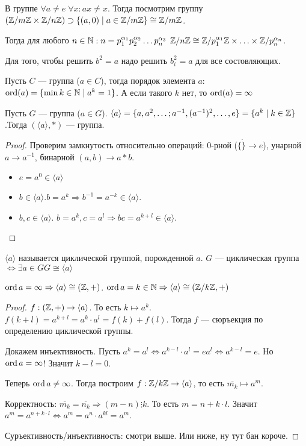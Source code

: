 В группе $\forall a \neq e\; \forall x: ax \neq x$. Тогда посмотрим группу  $(\mathbb{Z} / m\mathbb{Z} \times \mathbb{Z} / n\mathbb{Z}) \supset \{(a, 0) \mid a \in \mathbb{Z} / m\mathbb{Z}\} \cong \mathbb{Z} / m\mathbb{Z}$.
 
Тогда для любого $n \in \mathbb{N}: n = p_1^{\alpha_1} p_2^{\alpha_2}\ldots p_n^{\alpha_3}$  $\mathbb{Z} / n\mathbb{Z} \cong \mathbb{Z} / p_1^{\alpha_1}\mathbb{Z} \times \ldots \times \mathbb{Z} / p_n^{\alpha_n}$.
\begin{example}
    Для того, чтобы решить $b^2 = a$ надо решить  $b_i^2 = a$ для все состовляющих.
\end{example}
\begin{definition}
    Пусть $C$ --- группа ($a \in C$), тогда порядок элемента $a$:  $\operatorname{ord}(a) = \{\min k \in \mathbb{N} \mid a^k = 1\}$. А если такого  $k$ нет, то  $\operatorname{ord}(a) = \infty$
\end{definition}
\begin{lemma}
    Пусть $G$ --- группа ($a \in G$). $\langle a \rangle = \{a, a^2,\ldots; a^{-1}, (a^{-1})^2, \ldots, e\} = \{a^k \mid k \in \mathbb{Z}\}$.Тогда $(\langle a \rangle, *)$ --- группа.
\end{lemma}
\begin{proof}
    Проверим замкнутость относительно операций: 0-рной ($\{\dot\} \to e$), унарной $a \to a^{-1}$, бинарной  $(a, b) \to a * b$.
    \begin{itemize}
        \item $e = a^0 \in \langle a \rangle$
        \item  $b \in \langle a \rangle. b = a^k \Rightarrow b^{-1} = a^{-k} \in \langle a \rangle$.
        \item  $b, c \in \langle a \rangle$.  $b = a^k, c = a^l \Rightarrow bc = a^{k+l} \in \langle a \rangle$.
    \end{itemize}
\end{proof}
\begin{definition}
    $\langle a \rangle$ называется циклической группой, порожденной  $a$.  $G$ --- циклическая группа  $ \iff \exists a \in G G \cong \langle a \rangle$
\end{definition}
\begin{theorem}
    $\operatorname{ord} a = \infty \Rightarrow \langle a \rangle \cong (\mathbb{Z}, +)$.  $\operatorname{ord} a = k \in \mathbb{N} \Rightarrow \langle a \rangle \cong (\mathbb{Z} / k\mathbb{Z}, +)$
\end{theorem}
\begin{proof}
    $f: (\mathbb{Z}, +) \to \langle a \rangle$. То есть  $k \mapsto a^k$.  $f(k+l) = a^{k+l} = a^k \cdot a^l = f(k) + f(l)$. Тогда $f$ --- сюръекция по определению циклической группы.

    Докажем инъективность. Пусть $a^k = a^l \iff a^{k-l} \cdot a^l = e a^l \iff a^{k-l} = e$. Но  $\operatorname{ord} a = \infty$! Значит $k-l=0$.  

    Теперь $\operatorname{ord} a \neq \infty$. Тогда построим  $f: \mathbb{Z} / k \mathbb{Z} \to \langle a \rangle$, то есть  $\overline{m_k} \mapsto a^m$.

    Корректность:  $\overline{m_k} = \overline{n_k} \Rightarrow (m - n) \vdots k$. То есть $m = n + k \cdot l$. Значит  $a^m = a^{n + k \cdot l} \iff a^m = a^n \cdot a^{kl} = a^m$.

    Суръективность/инъективность: смотри выше. Или ниже, ну тут бан короче.
\end{proof}
